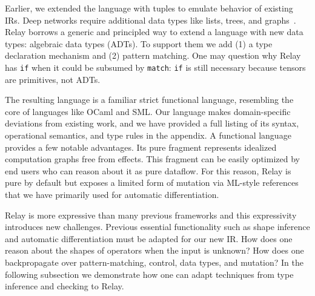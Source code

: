 Earlier, we extended the language with tuples to
  emulate behavior of existing IRs.
Deep networks require additional data types like lists,
  trees, and graphs~\citep{char-rnn, tree_lstm, graph_lstm}.
Relay borrows a generic and principled way to
  extend a language with new data types:
  algebraic data types (ADTs).
To support them we add (1) a type declaration mechanism and
  (2) pattern matching.
One may question why Relay has \verb|if| when it could be subsumed by \verb|match|:
  \verb|if| is still necessary because tensors are primitives, not ADTs.

The resulting language is a familiar strict functional language,
  resembling the core of languages like OCaml and SML.
Our language makes domain-specific deviations from existing work,
  and we have provided a full listing
  of its syntax, operational semantics, and type rules
  in the appendix.
A functional language provides a few notable advantages.
Its pure fragment represents idealized computation graphs free
  from effects. This fragment can be easily optimized by end users who
  can reason about it as pure dataflow.
For this reason, Relay is pure by default but exposes a limited
  form of mutation via ML-style references that we have
  primarily used for automatic differentiation.

Relay is more expressive than many previous frameworks and this expressivity introduces new challenges.
  Previous essential functionality such
    as shape inference and automatic differentiation must be adapted for
    our new IR.
How does one reason about the shapes of operators when the input is unknown?
How does one backpropagate over pattern-matching, control, data types, and mutation?
In the following subsection we demonstrate how one can adapt techniques
  from type inference and checking to Relay.







